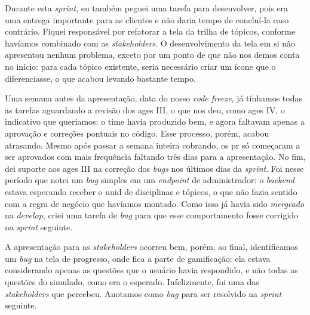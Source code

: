 Durante esta \textit{sprint}, eu também peguei uma tarefa para desenvolver, pois era uma entrega importante para as clientes e não daria tempo de concluí-la caso contrário. Fiquei responsável por refatorar a tela da trilha de tópicos, conforme havíamos combinado com as \textit{stakeholders}. O desenvolvimento da tela em si não apresentou nenhum problema, exceto por um ponto de que não nos demos conta no início: para cada tópico existente, seria necessário criar um ícone que o diferenciasse, o que acabou levando bastante tempo.

Uma semana antes da apresentação, data do nosso \textit{code freeze}, já tínhamos todas as tarefas aguardando a revisão dos \ac{ages} III, o que nos deu, como \ac{ages} IV, o indicativo que queríamos: o time havia produzido bem, e agora faltavam apenas a aprovação e correções pontuais no código. Esse processo, porém, acabou atrasando. Mesmo após passar a semana inteira cobrando, os \ac{pr} só começaram a ser aprovados com mais frequência faltando três dias para a apresentação. No fim, dei suporte aos \ac{ages} III na correção dos \textit{bugs} nos últimos dias da \textit{sprint}. Foi nesse período que notei um \textit{bug} simples em um \textit{endpoint} de administrador: o \textit{backend} estava esperando receber o \ac{uuid} de disciplinas e tópicos, o que não fazia sentido com a regra de negócio que havíamos montado. Como isso já havia sido \textit{mergeado} na \textit{develop}, criei uma tarefa de \textit{bug} para que esse comportamento fosse corrigido na \textit{sprint} seguinte.

A apresentação para as \textit{stakeholders} ocorreu bem, porém, ao final, identificamos um \textit{bug} na tela de progresso, onde fica a parte de gamificação: ela estava considerando apenas as questões que o usuário havia respondido, e não todas as questões do simulado, como era o esperado. Infelizmente, foi uma das \textit{stakeholders} que percebeu. Anotamos como \textit{bug} para ser resolvido na \textit{sprint} seguinte.
